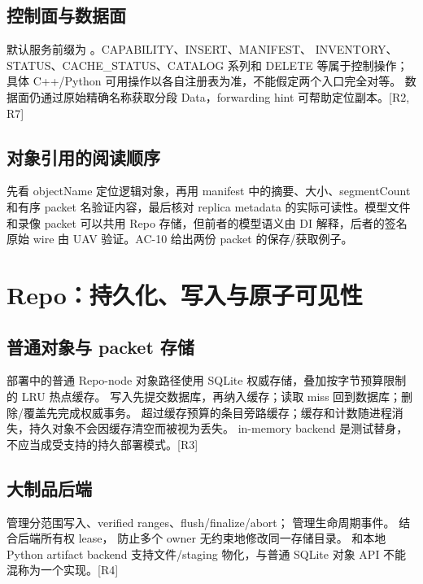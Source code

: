 \subsection{控制面与数据面}
默认服务前缀为 。CAPABILITY、INSERT、MANIFEST、
INVENTORY、STATUS、CACHE\_STATUS、CATALOG 系列和 DELETE 等属于控制操作；
具体 C++/Python 可用操作以各自注册表为准，不能假定两个入口完全对等。
数据面仍通过原始精确名称获取分段 Data，forwarding hint 可帮助定位副本。[R2, R7]



\subsection{对象引用的阅读顺序}
先看 objectName 定位逻辑对象，再用 manifest 中的摘要、大小、segmentCount 和有序 packet 名验证内容，最后核对 replica metadata 的实际可读性。模型文件和录像 packet 可以共用 Repo 存储，但前者的模型语义由 DI 解释，后者的签名原始 wire 由 UAV 验证。AC-10 给出两份 packet 的保存/获取例子。

\newpage

\section{Repo：持久化、写入与原子可见性}
\subsection{普通对象与 packet 存储}
部署中的普通 Repo-node 对象路径使用 SQLite 权威存储，叠加按字节预算限制的 LRU 热点缓存。
写入先提交数据库，再纳入缓存；读取 miss 回到数据库；删除/覆盖先完成权威事务。
超过缓存预算的条目旁路缓存；缓存和计数随进程消失，持久对象不会因缓存清空而被视为丢失。
in-memory backend 是测试替身，不应当成受支持的持久部署模式。[R3]

\subsection{大制品后端}
 管理分范围写入、verified ranges、flush/finalize/abort；
 管理生命周期事件。 结合后端所有权 lease，
防止多个 owner 无约束地修改同一存储目录。
和本地 Python artifact backend 支持文件/staging 物化，与普通 SQLite 对象 API 不能混称为一个实现。[R4]


